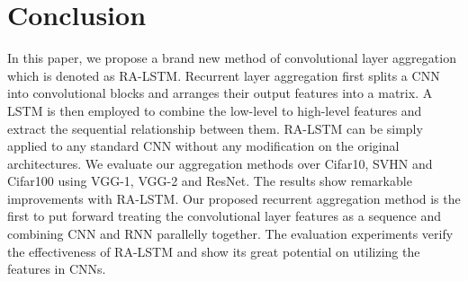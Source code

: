 \documentclass[runningheads]{llncs}
\begin{document}
\section{Conclusion}
In this paper, we propose a brand new method of convolutional layer aggregation which is denoted as RA-LSTM. Recurrent layer aggregation first splits a CNN into convolutional blocks and arranges their output features into a matrix. A LSTM is then employed to combine the low-level to high-level features and extract the sequential relationship between them. RA-LSTM can be simply applied to any standard CNN without any modification on the original architectures. We evaluate our aggregation methods over Cifar10, SVHN and Cifar100 using VGG-1, VGG-2 and ResNet. The results show remarkable improvements with RA-LSTM. Our proposed recurrent aggregation method is the first to put forward treating the convolutional layer features as a sequence and combining CNN and RNN parallelly together. The evaluation experiments verify the effectiveness of RA-LSTM and show its great potential on utilizing the features in CNNs.




\end{document}
